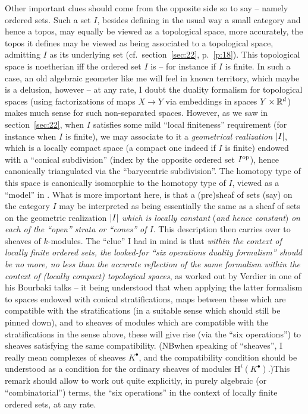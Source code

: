 Other important clues should come from the opposite side so to say --
namely ordered sets. Such a set $I$, besides defining in the usual way
a small category and hence a topos, may equally be viewed as a
topological space, more accurately, the topos it defines may be viewed
as being associated to a topological space, admitting $I$ as its
underlying set (cf.\ section~\ref{sec:22}, p.~\ref{p:18}). This
topological space is noetherian if{f} the ordered set $I$ is -- for
instance if $I$ is finite. In such a case, an old algebraic geometer
like me will feel in known territory, which maybe is a delusion,
however -- at any rate, I doubt the duality formalism for topological
spaces (using factorizations of maps $X\to Y$ via embeddings in spaces
$Y\times{\ensuremath{\mathbb{R}}}^d$) makes much sense for such non-separated
spaces. However, as we saw in section~\ref{sec:22}, when $I$ satisfies
some mild ``local finiteness'' requirement (for instance when $I$ is
finite), we may associate to it a \emph{geometrical realization} $\lvert I\rvert$, which is a locally compact space (a compact one indeed if $I$ is
finite) endowed with a ``conical subdivision'' (index by the opposite
ordered set $I^{\mathrm{op}}$), hence canonically triangulated via the
``barycentric subdivision''. The homotopy type of this space is
canonically isomorphic to the homotopy type of $I$, viewed as a
``model'' in \Cat. What is more important here, is that a (pre)sheaf
of sets (say) on the category $I$ may be interpreted as being
essentially the same as a sheaf of sets on the geometric realization
$\lvert I\rvert$ \emph{which is locally constant} (\emph{and hence constant})
\emph{on each of the \emph{``open''} strata or ``cones'' of $I$}. This
description then carries over to sheaves of $k$-modules. The ``clue''
I had in mind is that \emph{within the context of locally finite
  ordered sets, the looked-for ``six operations duality formalism''
  should be no more, no less than the accurate reflection of the same
  formalism within the context of \textup(locally
  compact\textup) topological spaces}, as worked out by Verdier in one
of his Bourbaki talks -- it being understood that when applying the
latter formalism to spaces endowed with conical stratifications, maps
between these which are compatible with the stratifications (in a
suitable sense which should still be pinned down), and to sheaves of
modules which are compatible with the stratifications in the sense
above, these will give rise (via the ``six operations'') to sheaves
satisfying the same compatibility. (NB\enspace when speaking of
``sheaves'', I really mean complexes of sheaves $K^\bullet$, and the
compatibility condition should be understood as a condition for the
ordinary sheaves of modules $\mathrm H^i(K^\bullet)$.)\enspace This
remark should allow to work out quite explicitly, in purely algebraic
(or ``combinatorial'') terms, the ``six operations'' in the context of
locally finite ordered sets, at any rate.

